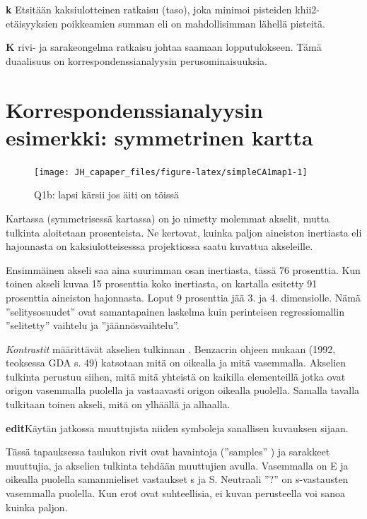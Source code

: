 \documentclass[
  finnish,
]{book}
\begin{document}
\textbf{k} Etsitään kaksiulotteinen ratkaisu (taso), joka minimoi pisteiden
khii2-etäisyyksien poikkeamien summan eli on mahdollisimman lähellä pisteitä.

\textbf{K} rivi- ja sarakeongelma ratkaisu johtaa saamaan lopputulokseen. Tämä
duaalisuus on korrespondenssianalyysin perusominaisuuksia.

\hypertarget{korrespondenssianalyysin-esimerkki-symmetrinen-kartta}{%
\section{Korrespondenssianalyysin esimerkki: symmetrinen kartta}\label{korrespondenssianalyysin-esimerkki-symmetrinen-kartta}}

\begin{figure}

{\centering \texttt{[image: JH\_capaper\_files/figure-latex/simpleCA1map1-1]} 

}

\caption{Q1b: lapsi kärsii jos äiti on töissä}\label{fig:simpleCA1map1}
\end{figure}

Kartassa (symmetrisessä kartassa) on jo nimetty molemmat akselit, mutta tulkinta
aloitetaan prosenteista. Ne kertovat, kuinka paljon aineiston inertiasta eli
hajonnasta on kaksiulotteisesssa projektiossa saatu kuvattua akseleille.

Ensimmäinen akseli saa aina suurimman osan inertiasta, tässä 76 prosenttia.
Kun toinen akseli kuvaa 15 prosenttia koko inertiasta, on kartalla esitetty 91
prosenttia aineiston hajonnasta. Loput 9 prosenttia jää 3. ja 4. dimensiolle.
Nämä ''selitysosuudet'' ovat samantapainen laskelma kuin perinteisen regressiomallin
''selitetty'' vaihtelu ja ''jäännösvaihtelu''.

\emph{Kontrastit} määrittävät akselien tulkinnan . Benzacrin ohjeen mukaan (1992,
teoksessa GDA s. 49) katsotaan mitä on oikealla ja mitä vasemmalla. Akselien
tulkinta perustuu siihen, mitä mitä yhteistä on kaikilla elementeillä jotka ovat
origon vasemmalla puolella ja vastaavasti origon oikealla puolella. Samalla tavalla
tulkitaan toinen akseli, mitä on ylhäällä ja alhaalla.

\textbf{edit}Käytän jatkossa muuttujista niiden symboleja sanallisen kuvauksen sijaan.

Tässä tapauksessa taulukon rivit ovat havaintoja (''samples'' ) ja sarakkeet
muuttujia, ja akselien tulkinta tehdään muuttujien avulla. Vasemmalla on E ja
oikealla puolella samanmieliset vastaukset s ja S. Neutraali ''?'' on s-vastausten
vasemmalla puolella. Kun erot ovat suhteellisia, ei kuvan perusteella voi sanoa
kuinka paljon.
\end{document}
